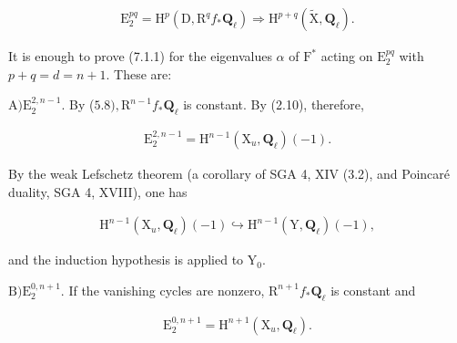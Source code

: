 \documentclass[10pt,leqno]{article}
\begin{document}
\begin{equation*}\begin{gathered}\mathrm{E}_{2}^{pq}=\mathrm{H}^{p}(\mathrm{D},\mathrm{R}^{q} f_{*}\mathbf{Q}_{\ell }) \Rightarrow  \mathrm{H}^{p+q}(\widetilde{\mathrm{X}},\mathbf{Q}_{\ell }).\end{gathered}\end{equation*}

\noindent It is enough to prove (7.1.1) for the eigenvalues \(\alpha \) of \(\mathrm{F}^{*}\) acting on \(\mathrm{E}_{2}^{pq}\) with \(p+q=d=n+1\). These are:\par

\noindent \(\mathrm{A}) \mathrm{E}_{2}^{2,n- 1}\). By (\(5.8), \mathrm{R}^{n- 1}f_{*}\mathbf{Q}_{\ell }\) is constant. By (2.10), therefore,\par

\begin{equation*}\begin{gathered}\mathrm{E}_{2}^{2,n- 1}=\mathrm{H}^{n- 1}(\mathrm{X}_{u},\mathbf{Q}_{\ell })(- 1).\end{gathered}\end{equation*}

\noindent By the weak Lefschetz theorem (a corollary of SGA 4, XIV (3.2), and Poincaré duality, SGA 4, XVIII), one has\par

\begin{equation*}\begin{gathered}\mathrm{H}^{n- 1}(\mathrm{X}_{u},\mathbf{Q}_{\ell })(- 1) \hookrightarrow  \mathrm{H}^{n- 1}(\mathrm{Y},\mathbf{Q}_{\ell })(- 1),\end{gathered}\end{equation*}

\noindent and the induction hypothesis is applied to \(\mathrm{Y}_{0}\).\par

\noindent \(\mathrm{B}) \mathrm{E}_{2}^{0,n+1}\). If the vanishing cycles are nonzero, \(\mathrm{R}^{n+1}f_{*}\mathbf{Q}_{\ell }\) is constant and\par

\begin{equation*}\begin{gathered}\mathrm{E}_{2}^{0,n+1}=\mathrm{H}^{n+1}(\mathrm{X}_{u},\mathbf{Q}_{\ell }).\end{gathered}\end{equation*}

\clearpage
\end{document}
